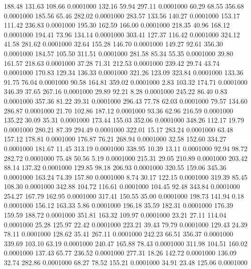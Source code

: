  188.48  131.63  108.66   0.0001000
 132.16   59.94  297.11   0.0001000
  60.29   68.55  356.68   0.0001000
 185.56   65.46  282.02   0.0001000
 283.57  133.56  140.27   0.0001000
 153.17  111.42  236.83   0.0001000
 195.30  162.59  166.00   0.0001000
 218.35   40.96  168.12   0.0001000
 194.41   73.96  134.14   0.0001000
 303.41  127.37  116.42   0.0001000
 324.12   41.58  281.62   0.0001000
  32.64  155.28  146.70   0.0001000
 149.27   92.61  356.30   0.0001000
 184.57  105.50  311.51   0.0001000
 281.58   85.34   55.35   0.0001000
  39.80  161.57  218.63   0.0001000
  37.28   71.31  212.53   0.0001000
 239.42   29.74   43.74   0.0001000
 170.83  129.34  136.33   0.0001000
 321.26  123.09  323.84   0.0001000
 133.36   91.75   76.04   0.0001000
  90.58  164.81  359.02   0.0001000
   2.83  103.32  174.71   0.0001000
 346.39   37.65  267.16   0.0001000
  29.89   92.21    8.28   0.0001000
 245.22   86.40    0.83   0.0001000
 357.36   81.22   39.31   0.0001000
 296.43   77.78   62.03   0.0001000
  79.57  134.60  286.87   0.0001000
  21.70  102.86  187.12   0.0001000
  93.36   62.96  216.59   0.0001000
 135.22   30.09   35.31   0.0001000
 173.44  155.03  352.06   0.0001000
 348.26  112.17   19.79   0.0001000
 280.21   87.39  294.49   0.0001000
 322.01   15.17  283.24   0.0001000
  63.48  157.12  178.81   0.0001000
 176.87   76.21  268.94   0.0001000
  32.58  152.60  334.27   0.0001000
 181.67   11.45  313.19   0.0001000
 338.95   10.39   13.11   0.0001000
  92.94   98.72  282.72   0.0001000
  75.48   50.56    5.19   0.0001000
 215.31   29.05  210.89   0.0001000
 203.42   88.14  137.32   0.0001000
 129.85   98.18  206.93   0.0001000
 320.55  159.06  345.36   0.0001000
 163.24   74.39  157.80   0.0001000
   8.74   30.17  122.15   0.0001000
 319.39   85.45  108.30   0.0001000
 342.88  104.72  116.61   0.0001000
 104.45   92.48  343.84   0.0001000
 254.27  167.79  162.95   0.0001000
 317.41  150.55   35.00   0.0001000
 198.73  141.94    0.18   0.0001000
 156.12  163.33    5.86   0.0001000
 196.18   35.59  182.31   0.0001000
 176.39  159.59  188.72   0.0001000
 351.81  163.32  109.97   0.0001000
  23.21   27.11  114.04   0.0001000
  25.28  125.97   22.42   0.0001000
 223.21   39.43   79.79   0.0001000
 129.43   24.39   78.11   0.0001000
 128.62   35.41  267.11   0.0001000
 242.23   66.51  356.37   0.0001000
 339.69  103.10   63.19   0.0001000
 240.47  165.88   78.43   0.0001000
 311.98  104.51  160.02   0.0001000
 137.43   65.77  236.52   0.0001000
 277.31   18.26  142.72   0.0001000
 136.09   32.74  282.86   0.0001000
  68.27   78.52  155.21   0.0001000
  34.91   23.48  125.06   0.0001000
